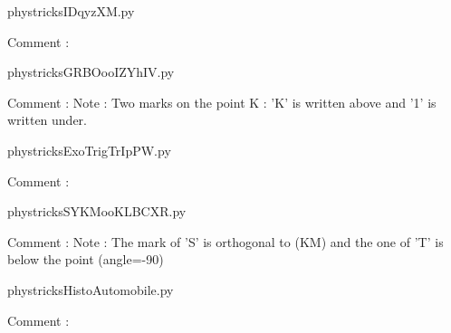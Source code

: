 
    \newcommand{\CaptionFigIDqyzXM}{<+Type your caption here+>}
    \begin{center}
        
    \end{center}
    phystricksIDqyzXM.py

    Comment : 

    \clearpage
    


    \newcommand{\CaptionFigGRBOooIZYhIV}{<+Type your caption here+>}
    \begin{center}
        
    \end{center}
    phystricksGRBOooIZYhIV.py

    Comment : Note : Two marks on the point K : 'K' is written above and '1' is written under.

    \clearpage
    


    \newcommand{\CaptionFigExoTrigTrIpPW}{<+Type your caption here+>}
    \begin{center}
        
    \end{center}
    phystricksExoTrigTrIpPW.py

    Comment : 

    \clearpage
    


    \newcommand{\CaptionFigSYKMooKLBCXR}{<+Type your caption here+>}
    \begin{center}
        
    \end{center}
    phystricksSYKMooKLBCXR.py

    Comment : Note : The mark of 'S' is orthogonal to (KM) and the one of 'T' is below the point (angle=-90)

    \clearpage
    


    \newcommand{\CaptionFigHistoAutomobile}{<+Type your caption here+>}
    \begin{center}
        
    \end{center}
    phystricksHistoAutomobile.py

    Comment : 


